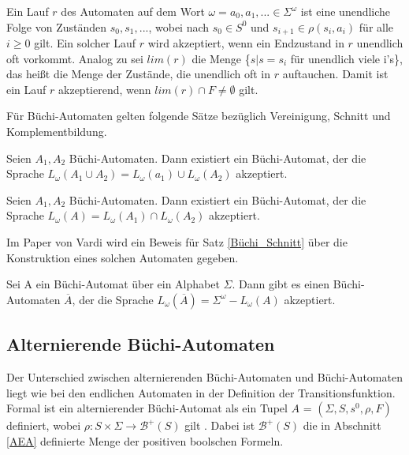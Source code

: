 Ein Lauf $r$ des Automaten auf dem Wort $\omega=a_0,a_1,... \in \Sigma^{\omega}$ ist eine unendliche Folge von Zuständen $s_0,s_1,...$, wobei nach \cite{vardi+96} $s_0 \in S^0$ und $s_{i+1} \in \rho(s_i, a_i)$ für alle $i \geq 0$ gilt. Ein solcher Lauf $r$ wird akzeptiert, wenn ein Endzustand in $r$ unendlich oft vorkommt. Analog zu \cite{vardi+96} sei $lim(r)$ die Menge \{$s|s=s_i$ für unendlich viele i's\}, das heißt die Menge der Zustände, die unendlich oft in $r$ auftauchen. Damit ist ein Lauf $r$ akzeptierend, wenn $lim(r)\cap F \neq \emptyset$ gilt.

Für Büchi-Automaten gelten folgende Sätze bezüglich Vereinigung, Schnitt und Komplementbildung. 

\begin{satz}\cite{choueka74, vardi+96}
\label{Büchi_Vereinigung}
Seien $A_1, A_2$ Büchi-Automaten. Dann existiert ein Büchi-Automat, der die Sprache $L_{\omega}(A_1\cup A_2)=L_{\omega}(a_1)\cup L_{\omega}(A_2)$ akzeptiert.
\end{satz}
\begin{satz}\cite{choueka74,vardi+96}
\label{Büchi_Schnitt}
Seien $A_1, A_2$ Büchi-Automaten. Dann existiert ein Büchi-Automat, der die Sprache $L_{\omega}(A)=L_{\omega}(A_1)\cap L_{\omega}(A_2)$ akzeptiert.
\end{satz}
Im Paper von Vardi \cite{vardi+96} wird ein Beweis für Satz \ref{Büchi_Schnitt} über die Konstruktion eines solchen Automaten gegeben.
\begin{satz}\cite{buechi62,vardi+96}
\label{Büchi_Komplement}
Sei A ein Büchi-Automat über ein Alphabet $\Sigma$. Dann gibt es einen Büchi-Automaten $\overline{A}$, der die Sprache $L_\omega(\overline{A})=\Sigma^\omega - L_\omega(A)$ akzeptiert.
\end{satz}

\subsection{Alternierende Büchi-Automaten}
\label{subsec:aba}
Der Unterschied zwischen alternierenden Büchi-Automaten und Büchi-Automaten liegt wie bei den endlichen Automaten in der Definition der Transitionsfunktion. Formal ist ein alternierender Büchi-Automat als ein Tupel $A$ = $(\Sigma,S,s^0,\rho,F)$ definiert, wobei $\rho : S \times \Sigma \rightarrow \mathcal{B}^+(S)$ gilt \cite{vardi+96}. Dabei ist $\mathcal{B}^+(S)$ die in Abschnitt \ref{AEA} definierte Menge der positiven boolschen Formeln.

